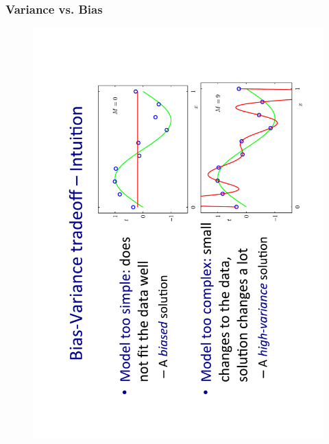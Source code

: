 \documentclass{beamer}
\begin{document}
\begin{frame}
\frametitle{Variance vs. Bias}
\begin{figure}
\includegraphics[angle=270,scale=0.35]{IMG/VarBias.pdf}
\end{figure}
\end{frame}



\end{document}
